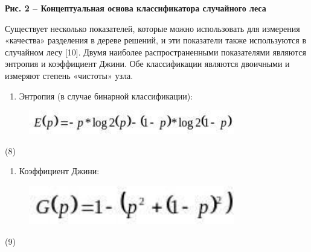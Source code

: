 {\bfseries Рис. 2 -- Концептуальная основа классификатора случайного леса}

Существует несколько показателей, которые можно использовать для
измерения «качества» разделения в дереве решений, и эти показатели также
используются в случайном лесу {[}10{]}. Двумя наиболее распространенными
показателями являются энтропия и коэффициент Джини. Обе классификации
являются двоичными и измеряют степень «чистоты» узла.

\begin{enumerate}
\def\labelenumi{\arabic{enumi}.}
\item
  Энтропия (в случае бинарной классификации):
\end{enumerate}

\begin{figure}[H]
	\centering
	\includegraphics[width=0.8\textwidth]{assets/112}
	\caption*{}
\end{figure} (8)

\begin{enumerate}
\def\labelenumi{\arabic{enumi}.}
\setcounter{enumi}{1}
\item
  Коэффициент Джини:
\end{enumerate}

\begin{figure}[H]
	\centering
	\includegraphics[width=0.8\textwidth]{assets/113}
	\caption*{}
\end{figure} (9)

